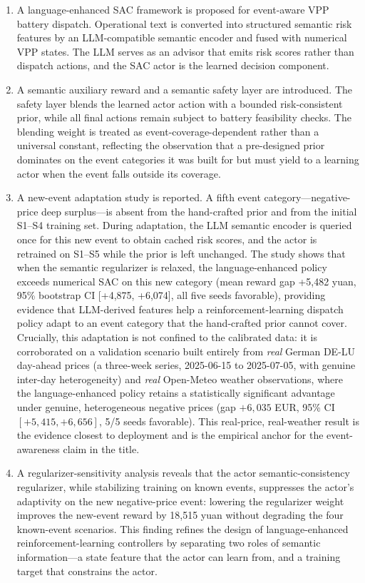 \documentclass{ieeeaccess}
\begin{document}
\begin{enumerate}
  \item A language-enhanced SAC framework is proposed for event-aware VPP battery dispatch. Operational text is converted into structured semantic risk features by an LLM-compatible semantic encoder and fused with numerical VPP states. The LLM serves as an advisor that emits risk scores rather than dispatch actions, and the SAC actor is the learned decision component.
  \item A semantic auxiliary reward and a semantic safety layer are introduced. The safety layer blends the learned actor action with a bounded risk-consistent prior, while all final actions remain subject to battery feasibility checks. The blending weight is treated as event-coverage-dependent rather than a universal constant, reflecting the observation that a pre-designed prior dominates on the event categories it was built for but must yield to a learning actor when the event falls outside its coverage.
  \item A new-event adaptation study is reported. A fifth event category---negative-price deep surplus---is absent from the hand-crafted prior and from the initial S1--S4 training set. During adaptation, the LLM semantic encoder is queried once for this new event to obtain cached risk scores, and the actor is retrained on S1--S5 while the prior is left unchanged. The study shows that when the semantic regularizer is relaxed, the language-enhanced policy exceeds numerical SAC on this new category (mean reward gap +5,482 yuan, 95\% bootstrap CI [+4,875, +6,074], all five seeds favorable), providing evidence that LLM-derived features help a reinforcement-learning dispatch policy adapt to an event category that the hand-crafted prior cannot cover. Crucially, this adaptation is not confined to the calibrated data: it is corroborated on a validation scenario built entirely from \emph{real} German DE-LU day-ahead prices (a three-week series, 2025-06-15 to 2025-07-05, with genuine inter-day heterogeneity) and \emph{real} Open-Meteo weather observations, where the language-enhanced policy retains a statistically significant advantage under genuine, heterogeneous negative prices (gap $+6{,}035$ EUR, 95\% CI $[+5{,}415, +6{,}656]$, 5/5 seeds favorable). This real-price, real-weather result is the evidence closest to deployment and is the empirical anchor for the event-awareness claim in the title.
  \item A regularizer-sensitivity analysis reveals that the actor semantic-consistency regularizer, while stabilizing training on known events, suppresses the actor's adaptivity on the new negative-price event: lowering the regularizer weight improves the new-event reward by 18,515 yuan without degrading the four known-event scenarios. This finding refines the design of language-enhanced reinforcement-learning controllers by separating two roles of semantic information---a state feature that the actor can learn from, and a training target that constrains the actor.

\end{enumerate}
\end{document}
